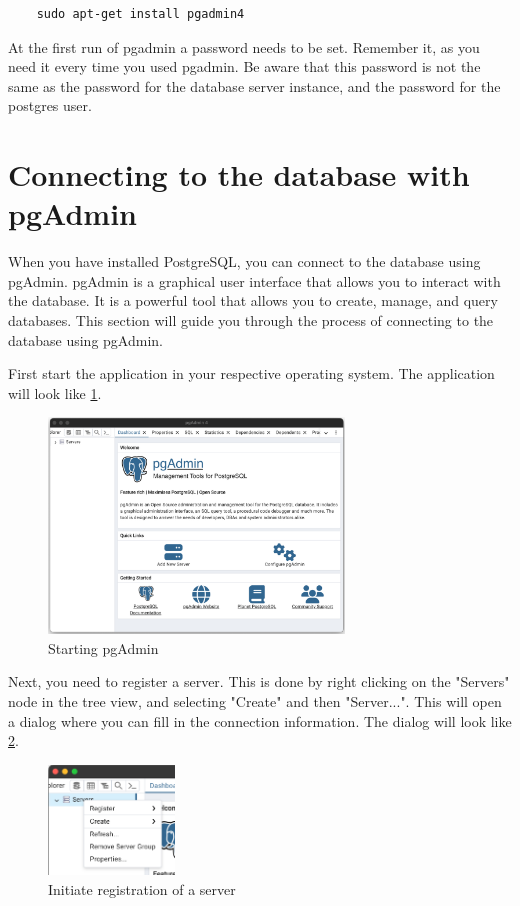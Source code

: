\begin{verbatim}
    sudo apt-get install pgadmin4
\end{verbatim}

At the first run of pgadmin a password needs to be set. Remember it, as you need it every time you used pgadmin. Be aware that this password is not the same as the password for the database server instance, and the password for the postgres user.

\section{Connecting to the database with pgAdmin}
When you have installed PostgreSQL, you can connect to the database using pgAdmin. pgAdmin is a graphical user interface that allows you to interact with the database. It is a powerful tool that allows you to create, manage, and query databases. This section will guide you through the process of connecting to the database using pgAdmin.

First start the application in your respective operating system. The application will look like \cref{fig:1.pgadmin1}.
\begin{figure}[H]
    \centering
    \includegraphics[width=0.7\textwidth]{content/1-relational-databases/figures/pgadmin/1.png}
    \caption{Starting pgAdmin}
    \label{fig:1.pgadmin1}
\end{figure}

Next, you need to register a server. This is done by right clicking on the "Servers" node in the tree view, and selecting "Create" and then "Server...". This will open a dialog where you can fill in the connection information. The dialog will look like \cref{fig:1.pgadmin2}.

\begin{figure}[H]
    \centering
    \includegraphics[width=0.3\textwidth]{content/1-relational-databases/figures/pgadmin/2.png}
    \caption{Initiate registration of a server}
    \label{fig:1.pgadmin2}
\end{figure}


